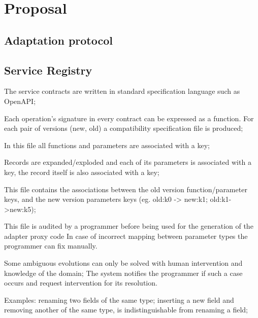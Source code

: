 
%

\chapter{Proposal}
\label{cha:proposal}

\section{Adaptation protocol} %
\label{sec:adaptation_protocol}

\section{Service Registry} %
\label{sec:service_registry}

The service contracts are written in standard specification language such as OpenAPI;

Each operation's signature in every contract can be expressed as a function.
For each pair of versions (new, old) a compatibility specification file is produced;

In this file all functions and parameters are associated with a key;

Records are expanded/exploded and each of its parameters is associated with a key, the record itself is also associated with a key;

This file contains the associations between the old version function/parameter keys, and the new version parameters keys (eg. old:k0 -> new:k1; old:k1->new:k5);

This file is audited by a programmer before being used for the generation of the adapter proxy code
In case of incorrect mapping between parameter types the programmer can fix manually.

Some ambiguous evolutions can only be solved with human intervention and knowledge of the domain;
The system notifies the programmer if such a case occurs and request intervention for its resolution.

Examples:
renaming two fields of the same type;
inserting a new field and removing another of the same type, is indistinguishable from renaming a field;

